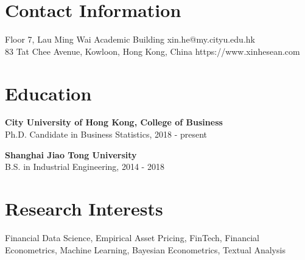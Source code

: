 \documentclass[margin]{res}
\begin{document}
\begin{resume}




\section{\sc Contact Information}
	Floor 7, Lau Ming Wai Academic Building	   \hfill xin.he@my.cityu.edu.hk\\        
	83 Tat Chee Avenue, Kowloon, Hong Kong, China 	\hfill   https://www.xinhesean.com \\

\section{\sc Education}
\textbf{City University of Hong Kong, College of Business}\\
{Ph.D. Candidate in Business Statistics, 2018 - present}

\textbf{Shanghai Jiao Tong University}\\
{B.S. in Industrial Engineering, 2014 - 2018}

\section{\sc Research Interests}
{Financial Data Science, Empirical Asset Pricing, FinTech, Financial Econometrics, Machine Learning, Bayesian Econometrics, Textual Analysis}

\vspace{5mm}


\end{resume}
\end{document}
